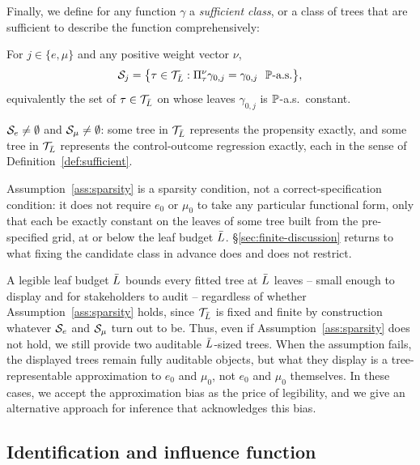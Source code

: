 \documentclass[12pt]{article}
\begin{document}
Finally, we define for any function $\gamma$ a \emph{sufficient class}, or a class of trees that are sufficient to describe the function comprehensively:
 \begin{definition}\label{def:sufficient}
For $j\in\{e,\mu\}$ and any positive weight vector $\nu$,
\[
  \cS_j=\bigl\{\tau\in\cT_{\Lbar}:
  \Pi^\nu_\tau\gamma_{0,j}=\gamma_{0,j}\ \ \Prob\text{-a.s.}\bigr\},
\]
equivalently the set of $\tau\in\mathcal{T}_{\bar{L}}$ on whose leaves $\gamma_{0,j}$ is
$\mathbb{P}$-a.s.\ constant.
\end{definition}

\begin{assumption}\label{ass:sparsity}
$\mathcal{S}_e\ne\emptyset$ and $\mathcal{S}_\mu\ne\emptyset$: some tree in $\mathcal{T}_{\bar{L}}$
represents the propensity exactly, and some tree in $\mathcal{T}_{\bar{L}}$ represents
the control-outcome regression exactly, each in the sense of
Definition~\ref{def:sufficient}.
\end{assumption}

Assumption~\ref{ass:sparsity} is a sparsity condition, not a
correct-specification condition: it does not require $e_0$ or $\mu_0$ to
take any particular functional form, only that each be exactly constant on
the leaves of some tree built from the pre-specified grid, at or below the
leaf budget $\bar{L}$. \S\ref{sec:finite-discussion} returns to what fixing
the candidate class in advance does and does not restrict.

\begin{remark}
\label{rem:legibility-not-complete}
A legible leaf budget $\bar{L}$ bounds every fitted tree at $\bar{L}$ leaves --
small enough to display and for stakeholders to audit --
regardless of whether Assumption~\ref{ass:sparsity} holds, since
$\mathcal{T}_{\bar{L}}$ is fixed and finite by construction whatever $\mathcal{S}_e$ and
$\mathcal{S}_\mu$ turn out to be. Thus, even if Assumption~\ref{ass:sparsity} does not hold, we still provide two auditable $\bar{L}$-sized trees. 
When the assumption fails, the displayed trees remain fully auditable
objects, but what they display is a tree-representable approximation to
$e_0$ and $\mu_0$, not $e_0$ and $\mu_0$ themselves. In these cases, we accept the approximation bias as the price of legibility, and we give an alternative approach for inference that acknowledges this bias.\end{remark}

 \subsection{Identification and influence function}
 
\end{document}
